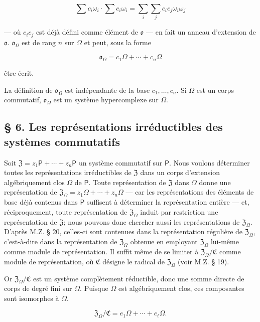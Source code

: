 \[
\sum c_i\omega_i\cdot \sum c_i\omega_i
=\sum_i\sum_j c_ic_j\omega_i\omega_j
\]

--- où \(c_ic_j\) est déjà défini comme élément de \(\mathfrak{o}\) --- en fait un anneau d'extension de \(\mathfrak{o}\). \(\mathfrak{o}_{\Omega}\) est de rang \(n\) sur \(\Omega\) et peut, sous la forme

\[
\mathfrak{o}_{\Omega}=c_1\Omega+\cdots+c_n\Omega
\]

être écrit.

La définition de \(\mathfrak{o}_{\Omega}\) est indépendante de la base \(c_1,\ldots,c_n\). Si \(\Omega\) est un corps commutatif, \(\mathfrak{o}_{\Omega}\) est un système hypercomplexe sur \(\Omega\).

\subsection*{\S{} 6. Les représentations irréductibles des systèmes commutatifs}\label{die-irreduziblen-darstellungen-kommutativer-systeme}

Soit \(\mathfrak Z=z_1\mathsf P+\cdots+z_n\mathsf P\) un système commutatif sur \(\mathsf P\). Nous voulons déterminer toutes les représentations irréductibles de \(\mathfrak Z\) dans un corps d'extension algébriquement clos \(\Omega\) de \(\mathsf P\). Toute représentation de \(\mathfrak Z\) dans \(\Omega\) donne une représentation de \(\mathfrak Z_\Omega=z_1\Omega+\cdots+z_n\Omega\) --- car les représentations des éléments de base déjà contenus dans \(\mathsf P\) suffisent à déterminer la représentation entière --- et, réciproquement, toute représentation de \(\mathfrak Z_\Omega\) induit par restriction une représentation de \(\mathfrak Z\); nous pouvons donc chercher aussi les représentations de \(\mathfrak Z_\Omega\). D'après M.Z. \S{} 20, celles-ci sont contenues dans la représentation régulière de \(\mathfrak Z_\Omega\), c'est-à-dire dans la représentation de \(\mathfrak Z_\Omega\) obtenue en employant \(\mathfrak Z_\Omega\) lui-même comme module de représentation. Il suffit même de se limiter à \(\mathfrak Z_\Omega/\mathfrak C\) comme module de représentation, où \(\mathfrak C\) désigne le radical de \(\mathfrak Z_\Omega\) (voir M.Z. \S{} 19).

Or \(\mathfrak Z_\Omega/\mathfrak C\) est un système complètement réductible, donc une somme directe de corps de degré fini sur \(\Omega\). Puisque \(\Omega\) est algébriquement clos, ces composantes sont isomorphes à \(\Omega\).

\[
\mathfrak Z_\Omega/\mathfrak C=e_1\Omega+\cdots+e_t\Omega.
\]

